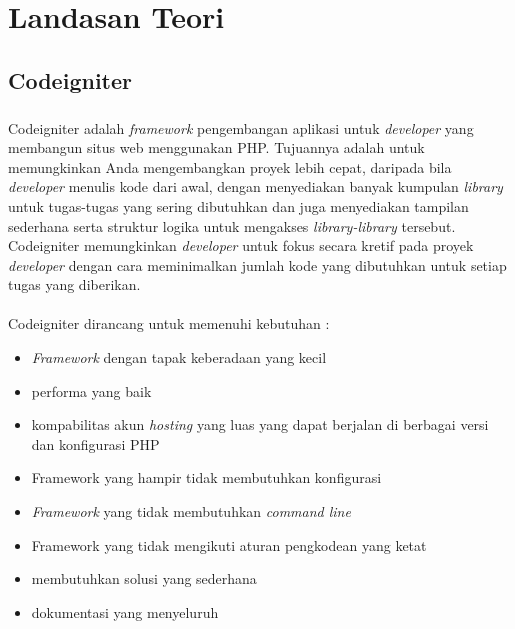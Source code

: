 \chapter{Landasan Teori}
\label{chap:teori}

\section{Codeigniter}
\label{sec:codeigniter} 
 
\paragraph{} Codeigniter adalah \textit{framework} pengembangan aplikasi untuk \textit{developer} yang membangun situs web menggunakan PHP. Tujuannya adalah untuk memungkinkan Anda mengembangkan proyek lebih cepat, daripada bila \textit{developer} menulis kode dari awal, dengan menyediakan banyak kumpulan \textit{library} untuk tugas-tugas yang sering dibutuhkan dan juga menyediakan tampilan sederhana serta struktur logika untuk mengakses \textit{library-library} tersebut. Codeigniter memungkinkan \textit{developer} untuk fokus secara kretif pada proyek \textit{developer} dengan cara meminimalkan jumlah kode yang dibutuhkan untuk setiap tugas yang diberikan.
\\
\\
Codeigniter dirancang untuk memenuhi kebutuhan :
\begin{itemize}
		\item \textit{Framework} dengan tapak keberadaan yang kecil
		\item performa yang baik
		\item kompabilitas akun \textit{hosting} yang luas yang dapat berjalan di berbagai versi dan konfigurasi PHP
		\item Framework yang hampir tidak membutuhkan konfigurasi
		\item \textit{Framework} yang tidak membutuhkan \textit{command line}
		\item Framework yang tidak mengikuti aturan pengkodean yang ketat
		\item membutuhkan solusi yang sederhana
		\item dokumentasi yang menyeluruh
	\end{itemize}
	
